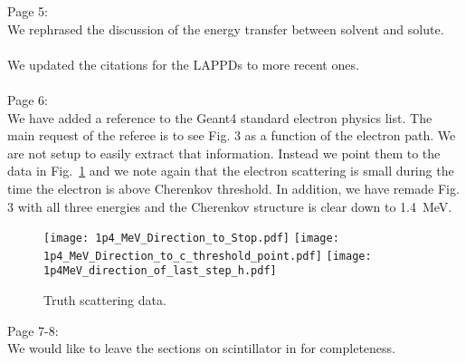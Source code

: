 \documentclass[11pt]{article}
\begin{document}
\noindent
Page 5: \\
We rephrased the discussion of the energy transfer between solvent and solute.\\ \\
We updated the citations for the LAPPDs to more recent ones.\\ \\

\noindent
Page 6: \\
We have added a reference to the Geant4 standard electron physics list.  The main request of the referee is to see Fig. 3 as a function of the electron path. We are not setup to easily extract that information. Instead we point them to the data in Fig.~\ref{truthscatt} and we note again that the electron scattering is small during the time the electron is above Cherenkov threshold. In addition, we have remade Fig. 3 with all three energies and the Cherenkov structure is clear down to 1.4~MeV.

\begin{figure}
        \begin{center}
        \texttt{[image: 1p4\_MeV\_Direction\_to\_Stop.pdf]} 
        \texttt{[image: 1p4\_MeV\_Direction\_to\_c\_threshold\_point.pdf]} 
        \texttt{[image: 1p4MeV\_direction\_of\_last\_step\_h.pdf]} 
         \caption[]{Truth scattering data.\label{truthscatt}}
        \end{center}
\end{figure}

\noindent
Page 7-8: \\
We would like to leave the sections on scintillator in for completeness.\\ \\
\end{document}
